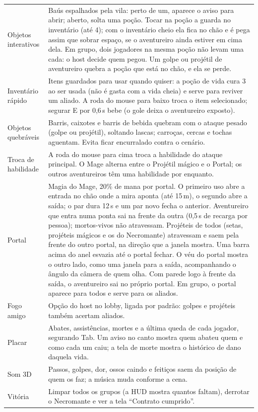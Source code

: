 \documentclass[11pt,a4paper]{article}
\begin{document}
\begin{tabularx}{\textwidth}{@{}lX@{}}
Objetos interativos & Baús espalhados pela vila: perto de um, aparece o aviso para abrir; aberto, solta uma poção. Tocar na poção a guarda no inventário (até 4); com o inventário cheio ela fica no chão e é pega assim que sobrar espaço, se o aventureiro ainda estiver em cima dela. Em grupo, dois jogadores na mesma poção não levam uma cada: o host decide quem pegou. Um golpe ou projétil de aventureiro quebra a poção que está no chão, e ela se perde. \\
Inventário rápido & Itens guardados para usar quando quiser: a poção de vida cura 3 ao ser usada (não é gasta com a vida cheia) e serve para reviver um aliado. A roda do mouse para baixo troca o item selecionado; segurar E por 0,6\,s bebe (o gole deixa o aventureiro exposto). \\
Objetos quebráveis & Barris, caixotes e barris de bebida quebram com o ataque pesado (golpe ou projétil), soltando lascas; carroças, cercas e tochas aguentam. Evita ficar encurralado contra o cenário. \\
Troca de habilidade & A roda do mouse para cima troca a habilidade do ataque principal. O Mage alterna entre o Projétil mágico e o Portal; os outros aventureiros têm uma habilidade por enquanto. \\
Portal & Magia do Mage, 20\% de mana por portal. O primeiro uso abre a entrada no chão onde a mira aponta (até 15\,m), o segundo abre a saída; o par dura 12\,s e um par novo fecha o anterior. Aventureiro que entra numa ponta sai na frente da outra (0,5\,s de recarga por pessoa); mortos-vivos não atravessam. Projéteis de todos (setas, projéteis mágicos e os do Necromante) atravessam e saem pela frente do outro portal, na direção que a janela mostra. Uma barra acima do anel esvazia até o portal fechar. O véu do portal mostra o outro lado, como uma janela para a saída, acompanhando o ângulo da câmera de quem olha. Com parede logo à frente da saída, o aventureiro sai no próprio portal. Em grupo, o portal aparece para todos e serve para os aliados. \\
Fogo amigo & Opção do host no lobby, ligada por padrão: golpes e projéteis também acertam aliados. \\
Placar & Abates, assistências, mortes e a última queda de cada jogador, segurando Tab. Um aviso no canto mostra quem abateu quem e como cada um caiu; a tela de morte mostra o histórico de dano daquela vida. \\
Som 3D & Passos, golpes, dor, ossos caindo e feitiços saem da posição de quem os faz; a música muda conforme a cena. \\
Vitória & Limpar todos os grupos (a HUD mostra quantos faltam), derrotar o Necromante e ver a tela ``Contrato cumprido''. \\
\bottomrule
\end{tabularx}
\end{document}

